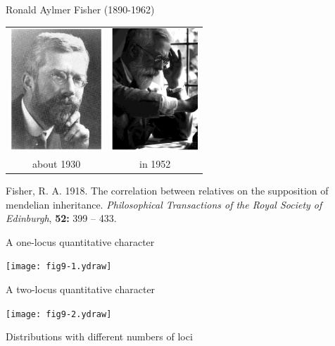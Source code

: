\documentclass[pdf,bluish,slideColor,colorBG]{prosper}
\begin{document}
{\begin{slide}[Replace]{Ronald Aylmer Fisher (1890-1962) }
\bigskip


\begin{center}
\begin{tabular}{c c}
\includegraphics[height=1.8in]{Fisher.ps} &
\includegraphics[height=1.8in]{Fisher1952.ps}\\
about 1930 & in 1952 
\end{tabular}
\end{center}

\noindent
Fisher, R. A.  1918.  The correlation between relatives on the supposition of
mendelian inheritance.  {\it Philosophical
Transactions of the Royal Society of Edinburgh}, {\bf 52:} 399 -- 433.

\end{slide}

\begin{slide}[Replace]{A one-locus quantitative character}

\centerline{\texttt{[image: fig9-1.ydraw]}}

\end{slide}

\begin{slide}[Replace]{A two-locus quantitative character}

\centerline{\texttt{[image: fig9-2.ydraw]}}

\end{slide}

\begin{slide}[Replace]{Distributions with different numbers of loci}


\end{slide}}
\end{document}
